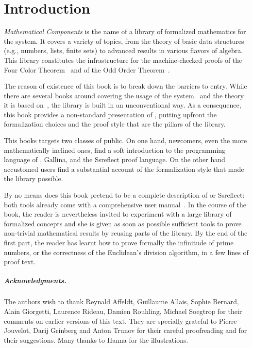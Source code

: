\setcounter{chapter}{-1}
\chapter{Introduction}

\emph{Mathematical Components}
is the name of a library of formalized mathematics for the
\Coq{} system.  It covers a variety of
topics, from the theory of basic data structures (e.g., numbers, lists, finite
sets) to advanced results in various flavors of algebra. This library
constitutes the infrastructure for the machine-checked proofs of the
Four Color Theorem~\cite{Gonthier08} and of the
Odd Order Theorem~\cite{gonthier:hal-00816699}.

The reason of existence of this book is to break down the barriers to entry.
While there are several books around covering the usage of the
\Coq{} system~\cite{BC04,SF,CPDT}
and the theory it is based
on~\cite[chapter 4]{Coq:manual}\cite{paulinmohring:hal-01094195,hottbook},
the \mcbMC{} library is built
in an unconventional way.  As a consequence, this book provides a
non-standard presentation of \Coq{}, putting upfront the formalization
choices and the proof style that are the pillars of the library.

This books targets two classes of public.  On one hand, newcomers,
even the more mathematically inclined ones, %
find a soft
introduction to the programming
language of \Coq{}, Gallina, and the Ssreflect proof language.
On the other hand accustomed \Coq{} users %
find a
substantial account of the formalization style that made the \mcbMC{}
library possible.


By no means does this book pretend to be a complete description of \Coq{} or
Ssreflect: both tools already come with a comprehensive user
manual~\cite{Coq:manual,ssrman}.
In the course of the book, the reader is nevertheless invited to
experiment with  a large library of formalized concepts and she is
given as soon as possible sufficient tools to prove non-trivial
mathematical results by reusing parts of the library. By the end of
the first part, the reader has learnt how to prove formally the
infinitude of prime numbers, or the correctness of the Euclidean's
division algorithm, in a few lines of proof text.

\paragraph{Acknowledgments.} The authors wish to thank
Reynald Affeldt, Guillaume Allais, Sophie Ber\-nard, Alain Giorgetti,
Laurence Rideau, Damien Rouhling, Michael Soegtrop for their comments
on earlier versions of this text. They are specially grateful to
Pierre Jouvelot, Darij Grinberg and Anton Trunov for their careful
proofreading and for their suggestions. Many thanks to Hanna for the
illustrations.

